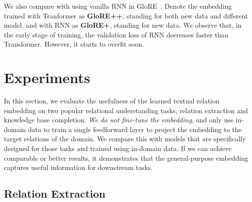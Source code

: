 \documentclass[11pt,a4paper]{article}
\begin{document}
We also compare with using vanilla RNN in GloRE~\cite{su2017global}. Denote the embedding trained with Tranformer as \textbf{GloRE++}, standing for both new data and different model, and with RNN as \textbf{GloRE+}, standing for new data. We observe that, in the early stage of training, the validation loss of RNN decreases faster than Transformer. However, it starts to overfit soon.










 \section{Experiments}
In this section, we evaluate the usefulness of the learned textual relation embedding on two popular relational understanding tasks, relation extraction and knowledge base completion. \emph{We do not fine-tune the embedding}, and only use in-domain data to train a single feedforward layer to project the embedding to the target relations of the domain. We compare this with models that are specifically designed for those tasks and trained using in-domain data. If we can achieve comparable or better results, it demonstrates that the general-purpose embedding captures useful information for downstream tasks.






\subsection{Relation Extraction}
\label{sec:relation_extraction}
\end{document}

